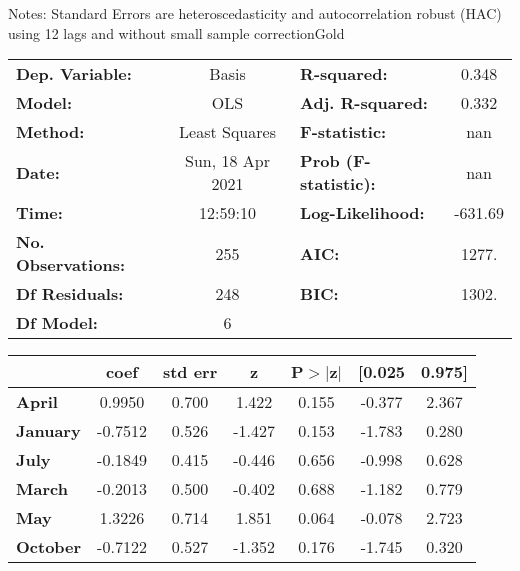 Notes: \newline
 [1] Standard Errors are heteroscedasticity and autocorrelation robust (HAC) using 12 lags and without small sample correctionGold\begin{center}
\begin{tabular}{lclc}
\toprule
\textbf{Dep. Variable:}    &      Basis       & \textbf{  R-squared:         } &     0.348   \\
\textbf{Model:}            &       OLS        & \textbf{  Adj. R-squared:    } &     0.332   \\
\textbf{Method:}           &  Least Squares   & \textbf{  F-statistic:       } &       nan   \\
\textbf{Date:}             & Sun, 18 Apr 2021 & \textbf{  Prob (F-statistic):} &      nan    \\
\textbf{Time:}             &     12:59:10     & \textbf{  Log-Likelihood:    } &   -631.69   \\
\textbf{No. Observations:} &         255      & \textbf{  AIC:               } &     1277.   \\
\textbf{Df Residuals:}     &         248      & \textbf{  BIC:               } &     1302.   \\
\textbf{Df Model:}         &           6      & \textbf{                     } &             \\
\bottomrule
\end{tabular}
\begin{tabular}{lcccccc}
                 & \textbf{coef} & \textbf{std err} & \textbf{z} & \textbf{P$> |$z$|$} & \textbf{[0.025} & \textbf{0.975]}  \\
\midrule
\textbf{April}   &       0.9950  &        0.700     &     1.422  &         0.155        &       -0.377    &        2.367     \\
\textbf{January} &      -0.7512  &        0.526     &    -1.427  &         0.153        &       -1.783    &        0.280     \\
\textbf{July}    &      -0.1849  &        0.415     &    -0.446  &         0.656        &       -0.998    &        0.628     \\
\textbf{March}   &      -0.2013  &        0.500     &    -0.402  &         0.688        &       -1.182    &        0.779     \\
\textbf{May}     &       1.3226  &        0.714     &     1.851  &         0.064        &       -0.078    &        2.723     \\
\textbf{October} &      -0.7122  &        0.527     &    -1.352  &         0.176        &       -1.745    &        0.320     \\

\end{tabular}
\end{center}

